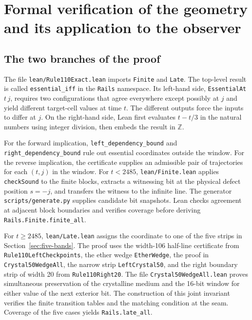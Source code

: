 \section{Formal verification of the geometry and its application to the observer}\label{app:lean}

\subsection{The two branches of the proof}
The file \texttt{lean/Rule110Exact.lean} imports \texttt{Finite} and \texttt{Late}. The top-level result is called \texttt{essential\_iff} in the \texttt{Rails} namespace. Its left-hand side, \texttt{EssentialAt}\,$t\,j$, requires two configurations that agree everywhere except possibly at $j$ and yield different target-cell values at time $t$. The different outputs force the inputs to differ at $j$. On the right-hand side, Lean first evaluates $t-t/3$ in the natural numbers using integer division, then embeds the result in $\mathbb Z$.

For the forward implication, \texttt{left\_dependency\_bound} and \texttt{right\_dependency\_bound} rule out essential coordinates outside the window. For the reverse implication, the certificate supplies an admissible pair of trajectories for each $(t,j)$ in the window. For $t<2485$, \texttt{lean/Finite.lean} applies \texttt{checkSound} to the finite blocks, extracts a witnessing bit at the physical defect position $s=-j$, and transfers the witness to the infinite line. The generator \texttt{scripts/generate.py} supplies candidate bit snapshots. Lean checks agreement at adjacent block boundaries and verifies coverage before deriving \texttt{Rails.Finite.finite\_all}.

For $t\ge2485$, \texttt{lean/Late.lean} assigns the coordinate to one of the five strips in Section~\ref{sec:five-bands}. The proof uses the width-106 half-line certificate from \texttt{Rule110LeftCheckpoints}, the ether wedge \texttt{EtherWedge}, the proof in \texttt{Crystal50WedgeAll}, the narrow strip \texttt{LeftCrystal50}, and the right boundary strip of width 20 from \texttt{Rule110Right20}. The file \texttt{Crystal50WedgeAll.lean} proves simultaneous preservation of the crystalline medium and the 16-bit window for either value of the next exterior bit. The construction of this joint invariant verifies the finite transition tables and the matching condition at the seam. Coverage of the five cases yields \texttt{Rails.late\_all}.


